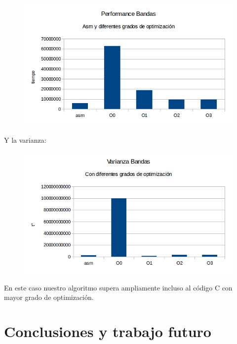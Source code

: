 \documentclass[a4paper]{article}
\begin{document}
\begin{figure}[h!]
  \begin{center}
  \includegraphics[scale=0.66]{Graficos1.4/ban/per.png}
  \label{nombreparareferenciar11}
  \end{center}
\end{figure}

Y la varianza:

\begin{figure}[h!]
  \begin{center}
  \includegraphics[scale=0.66]{Graficos1.4/ban/var.png}
  \label{nombreparareferenciar12}
  \end{center}
\end{figure}

En este caso nuestro algoritmo supera ampliamente incluso al código C con mayor grado de optimización.


\section{Conclusiones y trabajo futuro}
\end{document}

